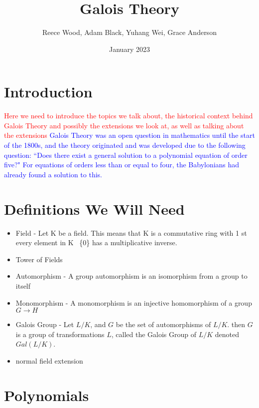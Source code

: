\documentclass[12pt]{article}
\title{\textbf{Galois Theory}}
\author{Reece Wood, Adam Black, Yuhang Wei, Grace Anderson}
\date{January 2023}
\begin{document}
\maketitle

\tableofcontents

\newpage
\section{Introduction}
\textcolor{red}{Here we need to introduce the topics we talk about, the historical context behind Galois Theory and possibly the extensions we look at, as well as talking about the extensions}
\textcolor{blue}{Galois Theory was an open question in mathematics until the start of the 1800s, and the theory originated and was developed due to the following question: ``Does there exist a general solution to a polynomial equation of order five?"  For equations of orders less than or equal to four, the Babylonians had already found a solution to this.}
\section{Definitions We Will Need}
\begin{itemize}
    \item Field - Let K be a field. This means that K is a commutative ring with 1 st every element in K \ \{0\} has a multiplicative inverse.
    \item Tower of Fields
    \item Automorphism - A group automorphism is an isomorphism from a group to itself
    \item Monomorphism - A monomorphism is an injective homomorphism of a group $G \rightarrow{} H$
    \item Galois Group - Let $L/K$, and $G$ be the set of automorphisms of $L/K$. then $G$ is a group of transformations $L$, called the Galois Group of $L/K$ denoted $Gal(L/K)$.
    \item normal field extension
\end{itemize}
\section{Polynomials}
\end{document}
